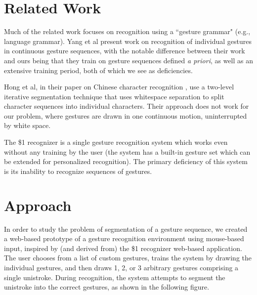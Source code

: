 \documentclass[twoside]{article}
\begin{document}
\begin{multicols}{2}

\section{Related Work}

Much of the related work focuses on recognition using a ``gesture grammar" (e.g., language grammar).
Yang et al \cite{yang_gesture_1994} present work on recognition of individual
gestures in continuous gesture sequences, with the notable difference between
their work and ours being that they train on gesture sequences defined \textit{a
priori}, as well as an extensive training period, both of which we see
as deficiencies.

Hong et al, in their paper on Chinese character recognition 
\cite{hong1998segmentation}, use a two-level iterative segmentation technique that uses
whitespace separation to split character sequences into individual characters.
Their approach does not work for our problem, where gestures are drawn in one continuous motion,
uninterrupted by white space.

The \$1 recognizer \cite{wobbrock2007gestures} is a single gesture
recognition system which works even without any training by the user (the system has a built-in gesture set which can be extended for personalized recognition). The primary
deficiency of this system is its inability to recognize sequences of gestures.

\section{Approach}

In order to study the problem of segmentation of a gesture sequence,
we created a web-based prototype of a gesture recognition environment using mouse-based input, inspired by (and derived from) the \$1 recognizer web-based application\cite{wobbrock2007gestures}. 
The user chooses from a list of custom gestures, trains the system by drawing the individual gestures,
and then draws 1, 2, or 3 arbitrary gestures comprising a single unistroke. During recognition,
the system attempts to segment the unistroke into the correct gestures, as shown in the following figure.


\end{multicols}
\end{document}
